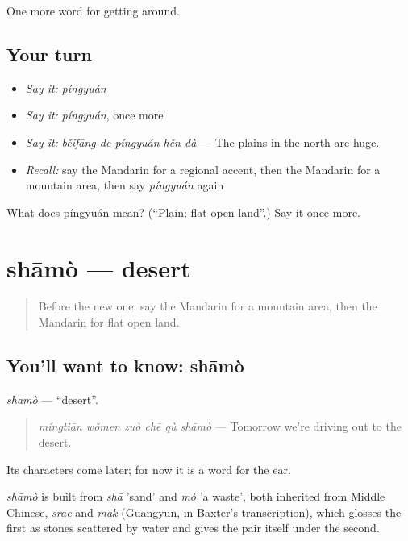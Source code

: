 \begin{grammarlens}[title={What you've built}]
One more word for getting around.
\end{grammarlens}

\subsection*{Your turn}
\begin{itemize}
\raggedright
  \item \emph{Say it:} \emph{píngyuán}
  \item \emph{Say it:} \emph{píngyuán}, once more
  \item \emph{Say it:} \emph{běifāng de píngyuán hěn dà} — The plains in the north are huge.
  \item \emph{Recall:} say the Mandarin for a regional accent, then the Mandarin for a mountain area, then say \emph{píngyuán} again
\end{itemize}

\begin{tcolorbox}[breakable,colback=teal!4,colframe=teal!35!black,title={Before you move on}]
What does píngyuán mean? (\textquotedblleft{}Plain; flat open land\textquotedblright{}.) Say it once more.
\end{tcolorbox}
\section[shāmò]{shāmò — desert}

\label{lesson:ZH-C437-shamo}



\begin{quote}
Before the new one: say the Mandarin for a mountain area, then the Mandarin for flat open land.
\end{quote}

\subsection*{You'll want to know: shāmò}
\emph{shāmò} — \textquotedblleft{}desert\textquotedblright{}.

\begin{quote}
\emph{míngtiān wǒmen zuò chē qù shāmò} — Tomorrow we're driving out to the desert.
\end{quote}

Its characters come later; for now it is a word for the ear.

\begin{cousinweb}
\emph{shāmò} is built from \emph{shā} 'sand' and \emph{mò} 'a waste', both inherited from Middle Chinese, \emph{srae} and \emph{mak} (Guangyun, in Baxter's transcription), which glosses the first as stones scattered by water and gives the pair itself under the second.
\end{cousinweb}

